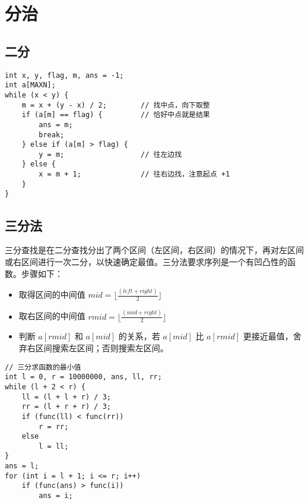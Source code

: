 \section{分治}
\subsection{二分}
\begin{verbatim}
int x, y, flag, m, ans = -1;
int a[MAXN];
while (x < y) {
    m = x + (y - x) / 2;        // 找中点，向下取整
    if (a[m] == flag) {         // 恰好中点就是结果
        ans = m;
        break;
    } else if (a[m] > flag) {
        y = m;                  // 往左边找
    } else {
        x = m + 1;              // 往右边找，注意起点 +1
    }
}
\end{verbatim}

\subsection{三分法}
\noindent \par 三分查找是在二分查找分出了两个区间（左区间，右区间）的情况下，再对左区间或右区间进行一次二分，以快速确定最值。三分法要求序列是一个有凹凸性的函数。步骤如下：

\begin{itemize}
    \item 取得区间的中间值 $mid = \lfloor \frac{(left + right)}{2} \rfloor$
    \item 取右区间的中间值 $rmid = \lfloor \frac{(mid + right)}{2} \rfloor$
    \item 判断 $a[rmid]$ 和 $a[mid]$ 的关系，若 $a[mid]$ 比 $a[rmid]$ 更接近最值，舍弃右区间搜索左区间；否则搜索左区间。
\end{itemize}

\begin{verbatim}
// 三分求函数的最小值
int l = 0, r = 10000000, ans, ll, rr;
while (l + 2 < r) {
    ll = (l + l + r) / 3;
    rr = (l + r + r) / 3;
    if (func(ll) < func(rr))
        r = rr;
    else
        l = ll;
}
ans = l;
for (int i = l + 1; i <= r; i++)
    if (func(ans) > func(i))
        ans = i;
\end{verbatim}

